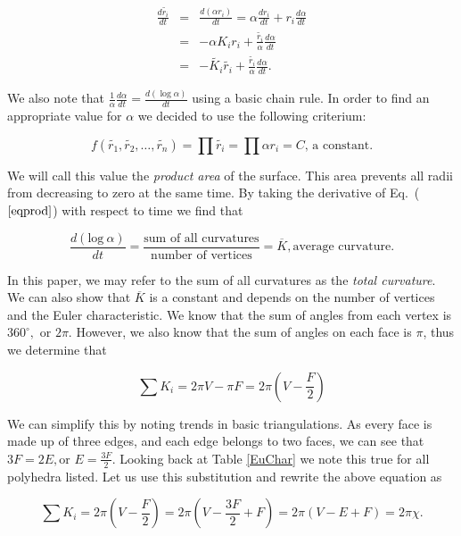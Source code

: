 \documentclass[12pt]{article}
\begin{document}
 \begin{eqnarray}
 \label{ref1}
 \frac{d\tilde{r_i}}{dt} &=& \frac{d(\alpha r_i)}{dt} = \alpha \frac{dr_i}{dt} + r_i\frac{d\alpha}{dt}\nonumber\\
 &=& -\alpha K_ir_i + \frac{\tilde{r_i}}{\alpha}\frac{d\alpha}{dt} \nonumber \\
 &=& -\tilde{K_i}\tilde{r_i} + \frac{\tilde{r_i}}{\alpha}\frac{d\alpha}{dt}.
 \end{eqnarray}
 
\noindent We also note that $\displaystyle \frac{1}{\alpha} \frac{d\alpha}{dt} = \frac{d(\log \alpha)}{dt}$ using a basic chain rule. In order to find an appropriate value for $\alpha$ we decided to use the following criterium:
 
\begin{equation}
\label{eqprod}
f(\tilde{r_1},\tilde{r_2},\ldots,\tilde{r_n}) = \prod{\tilde{r_i}} = \prod{\alpha r_i} = C\mbox{, a constant.}
\end{equation}

\noindent We will call this value the \textit{product area} of the surface. This area prevents all radii from decreasing to zero at the same time. By taking the derivative of Eq.~($\ref{eqprod}$) with respect to time we find that 
 
\begin{equation}
\label{proof1}
\frac{d(\mbox{log}~\alpha)}{dt} = \frac{\mbox{sum of all curvatures}}{\mbox{number of vertices}} = \overline{K}, \mbox{average curvature.}
\end{equation}

\noindent In this paper, we may refer to the sum of all curvatures as the \textit{total curvature}. We can also show that $\overline{K}$ is a constant and depends on the number of vertices and the Euler characteristic. We know that the sum of angles from each vertex is $360^\circ,$ or $2\pi$. However, we also know that the sum of angles on each face is $\pi$, thus we determine that 

$$\sum{K_i} = 2\pi V - \pi F = 2\pi(V - \frac{F}{2})$$

\noindent We can simplify this by noting trends in basic triangulations. As every face is made up of three edges, and each edge belongs to two faces, we can see that $3F = 2E, \mbox{or } E = \frac{3F}{2}$. Looking back at Table \ref{EuChar} we note this true for all polyhedra listed. Let us use this substitution and rewrite the above equation as

$$\sum{K_i} = 2\pi(V - \frac{F}{2}) = 2\pi(V - \frac{3F}{2} + F) = 2\pi(V - E + F) = 2\pi \chi.$$
\end{document}
